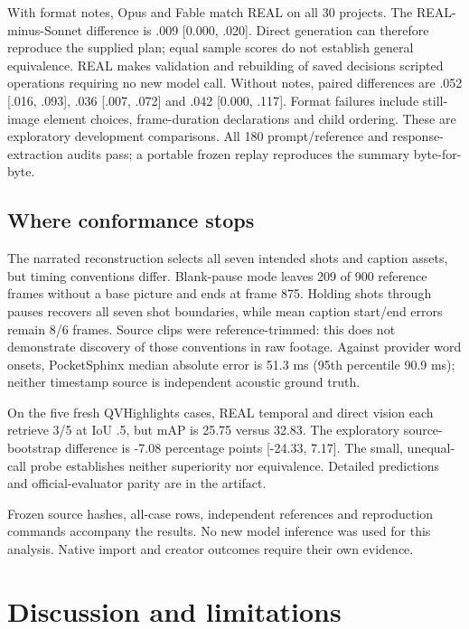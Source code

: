 \documentclass{ceurart}
\begin{document}
With format notes, Opus and Fable match REAL on all 30 projects. The
REAL-minus-Sonnet difference is .009 {[}0.000, .020{]}. Direct
generation can therefore reproduce the supplied plan; equal sample
scores do not establish general equivalence. REAL makes validation and
rebuilding of saved decisions scripted operations requiring no new model
call. Without notes, paired differences are .052 {[}.016, .093{]}, .036
{[}.007, .072{]} and .042 {[}0.000, .117{]}. Format failures include
still-image element choices, frame-duration declarations and child
ordering. These are exploratory development comparisons. All 180
prompt/reference and response-extraction audits pass; a portable frozen
replay reproduces the summary byte-for-byte.

\subsection{Where conformance stops}\label{where-conformance-stops}

The narrated reconstruction selects all seven intended shots and caption
assets, but timing conventions differ. Blank-pause mode leaves 209 of
900 reference frames without a base picture and ends at frame 875.
Holding shots through pauses recovers all seven shot boundaries, while
mean caption start/end errors remain 8/6 frames. Source clips were
reference-trimmed: this does not demonstrate discovery of those
conventions in raw footage. Against provider word onsets, PocketSphinx
median absolute error is 51.3 ms (95th percentile 90.9 ms); neither
timestamp source is independent acoustic ground truth.

On the five fresh QVHighlights cases, REAL temporal and direct vision
each retrieve 3/5 at IoU .5, but mAP is 25.75 versus 32.83. The
exploratory source-bootstrap difference is -7.08 percentage points
{[}-24.33, 7.17{]}. The small, unequal-call probe establishes neither
superiority nor equivalence. Detailed predictions and official-evaluator
parity are in the artifact.

Frozen source hashes, all-case rows, independent references and
reproduction commands accompany the results. No new model inference was
used for this analysis. Native import and creator outcomes require their
own evidence.

\section{Discussion and limitations}\label{discussion-and-limitations}
\end{document}

